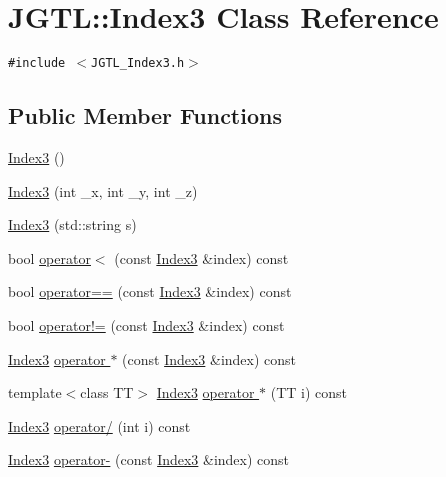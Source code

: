 \hypertarget{class_j_g_t_l_1_1_index3}{
\section{JGTL::Index3 Class Reference}
\label{class_j_g_t_l_1_1_index3}
}
{\tt \#include $<$JGTL\_\-Index3.h$>$}

\subsection*{Public Member Functions}
\begin{CompactItemize}
\item 
\hyperlink{class_j_g_t_l_1_1_index3_f0f6a8a45c6d654d5a1849e2150460b3}{Index3} ()
\item 
\hyperlink{class_j_g_t_l_1_1_index3_31318bf64f28cdf0b0bd8aaf88dd6c80}{Index3} (int \_\-x, int \_\-y, int \_\-z)
\item 
\hyperlink{class_j_g_t_l_1_1_index3_57c5d0432d9042ef9c1c20eaff615ec7}{Index3} (std::string s)
\item 
bool \hyperlink{class_j_g_t_l_1_1_index3_28b74fda507cd39db2cb49bd7a9eda11}{operator$<$} (const \hyperlink{class_j_g_t_l_1_1_index3}{Index3} \&index) const 
\item 
bool \hyperlink{class_j_g_t_l_1_1_index3_e366c587a926599d5976c3ade146109a}{operator==} (const \hyperlink{class_j_g_t_l_1_1_index3}{Index3} \&index) const 
\item 
bool \hyperlink{class_j_g_t_l_1_1_index3_85560dbad6aa0d284112b99a59e58fb4}{operator!=} (const \hyperlink{class_j_g_t_l_1_1_index3}{Index3} \&index) const 
\item 
\hyperlink{class_j_g_t_l_1_1_index3}{Index3} \hyperlink{class_j_g_t_l_1_1_index3_095316d8fa8a9df4f70882eacbf2d98f}{operator $\ast$} (const \hyperlink{class_j_g_t_l_1_1_index3}{Index3} \&index) const 
\item 
template$<$class TT$>$ \hyperlink{class_j_g_t_l_1_1_index3}{Index3} \hyperlink{class_j_g_t_l_1_1_index3_68651bf3c423c5404e8dee156b5ad209}{operator $\ast$} (TT i) const 
\item 
\hyperlink{class_j_g_t_l_1_1_index3}{Index3} \hyperlink{class_j_g_t_l_1_1_index3_9ed9d700039569d2a90bb9d3274c4ddf}{operator/} (int i) const 
\item 
\hyperlink{class_j_g_t_l_1_1_index3}{Index3} \hyperlink{class_j_g_t_l_1_1_index3_acda81612eb294b96943b7693526f6dc}{operator-} (const \hyperlink{class_j_g_t_l_1_1_index3}{Index3} \&index) const 
\item 

\end{CompactItemize}
